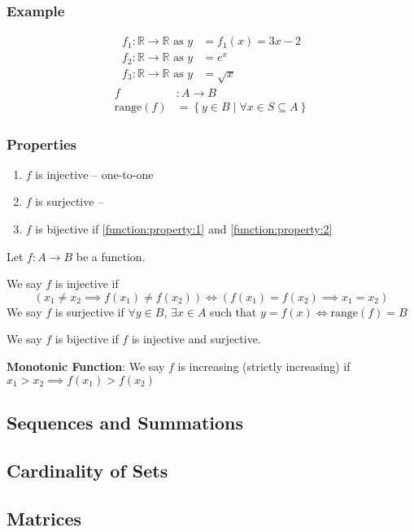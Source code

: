 \documentclass{article}
\begin{document}
\subsubsection{Example}

\begin{align*}
	f_1 : \mathbb{R} \rightarrow \mathbb{R} \text{ as } y & = f_1(x) = 3x - 2 \\
	f_2 : \mathbb{R} \rightarrow \mathbb{R} \text{ as } y & = e^{x}           \\
	f_3 : \mathbb{R} \rightarrow \mathbb{R} \text{ as } y & = \sqrt{x}
\end{align*}
\begin{align*}
	f               & : A \rightarrow B                                           \\
	\text{range}(f) & = \left\{ y \in B \mid \forall x \in S \subseteq A \right\}
\end{align*}

\subsubsection{Properties}

\begin{enumerate}[label = \textbf{\arabic*)}]
	\item \label{function:property:1} $ f $ is injective – one-to-one \\
	\item \label{function:property:2} $ f $ is surjective – \\
	\item $ f $ is bijective if \ref{function:property:1} and \ref{function:property:2}
\end{enumerate}

Let $ f : A \rightarrow B $ be a function.

We say $ f $ is injective if
\begin{equation*}
	\left( x_1 \neq x_2 \implies f(x_1) \neq f(x_2) \right) \iff \left( f(x_1) = f(x_2) \implies x_1 = x_2 \right)
\end{equation*}
We say $ f $ is surjective if $ \forall y \in B $, $ \exists x \in A $ such that $ y = f(x) \iff \text{range}(f) = B $

We say $ f $ is bijective if $ f $ is injective and surjective.

\textbf{Monotonic Function}: We say $ f $ is increasing (strictly increasing) if $ x_1 > x_2 \implies f(x_1) > f(x_2) $

\subsection{Sequences and Summations}

\subsection{Cardinality of Sets}

\subsection{Matrices}
\end{document}
